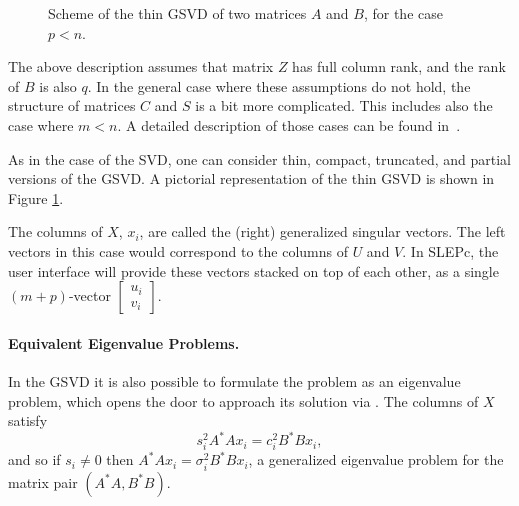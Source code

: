 \begin{figure}
\centering
{}
\caption{\label{fig:gsvd}Scheme of the thin GSVD of two matrices $A$ and $B$, for the case $p<n$.}
\end{figure}

The above description assumes that matrix $Z$ has full column rank, and the rank of $B$ is also $q$. In the general case where these assumptions do not hold, the structure of matrices $C$ and $S$ is a bit more complicated. This includes also the case where $m<n$. A detailed description of those cases can be found in~\citep[\S 2.3.5.3]{Anderson:1999:LUG}.

As in the case of the SVD, one can consider thin, compact, truncated, and partial versions of the GSVD. A pictorial representation of the thin GSVD is shown in Figure \ref{fig:gsvd}.

The columns of $X$, $x_i$, are called the (right) generalized singular vectors. The left vectors in this case would correspond to the columns of $U$ and $V$. In SLEPc, the user interface will provide these vectors stacked on top of each other, as a single $(m+p)$-vector $\begin{bmatrix}u_i\\v_i\end{bmatrix}$.

\paragraph{Equivalent Eigenvalue Problems.}
In the GSVD it is also possible to formulate the problem as an eigenvalue problem, which opens the door to approach its solution via . The columns of $X$ satisfy
\begin{equation}
\label{eq:gsvdeig}
s_i^2A^*Ax_i=c_i^2B^*Bx_i,
\end{equation}
and so if $s_i\neq 0$ then $A^*Ax_i=\sigma_i^2B^*Bx_i$, a generalized eigenvalue problem for the matrix pair $(A^*A,B^*B)$.

